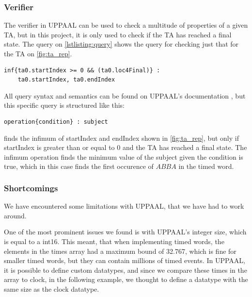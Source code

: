 \subsubsection{Verifier}\label{subsubsec:verifier}
The verifier in UPPAAL can be used to check a multitude of properties of a given TA, but in this project, it is only used to check if the TA has reached a final state. The query on \cref{lstlisting:query} shows the query for checking just that for the TA on \cref{fig:ta_rep}.

\begin{lstlisting}[basicstyle=\scriptsize]
    inf{ta0.startIndex >= 0 && (ta0.loc4Final)} : 
    ta0.startIndex, ta0.endIndex
\end{lstlisting}
\label{lstlisting:query}

All query syntax and semantics can be found on UPPAAL's documentation \cite{UPPAAL}, but this specific query is structured like this:
\begin{lstlisting}[basicstyle=\scriptsize]
    operation{condition} : subject
\end{lstlisting}
finds the infimum of startIndex and endIndex shown in \cref{fig:ta_rep}, but only if startIndex is greater than or equal to 0 and the TA has reached a final state. The infimum operation finds the minimum value of the subject given the condition is true, which in this case finds the first occurence of $ABBA$ in the timed word.


\subsubsection{Shortcomings}\label{subsubsec:shortcomings}
We have encountered some limitations with UPPAAL, that we have had to work around.


One of the most prominent issues we found is with UPPAAL's integer size, which is equal to a int16. This meant, that when implementing timed words, the elements in the times array had a maximum bound of 32.767, which is fine for smaller timed words, but they can contain millions of timed events. In UPPAAL, it is possible to define custom datatypes, and since we compare these times in the array to clock, in the following example, we thought to define a datatype with the same size as the clock datatype.

